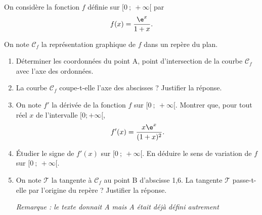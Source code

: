 \medskip

On considère la fonction $f$ définie sur $[0~;~+\infty[$ par \[f(x) =\dfrac{\e^x}{1+x}.\]

On note $\mathcal{C}_f$ la représentation graphique de $f$ dans un repère du plan.

\medskip

\begin{enumerate}
\item Déterminer les coordonnées du point A, point d'intersection de la courbe $\mathcal{C}_f$
avec l'axe des ordonnées.
\item La courbe $\mathcal{C}_f$ coupe-t-elle l'axe des abscisses ? Justifier la réponse.
\item On note $f'$ la dérivée de la fonction $f$ sur $[0~;~+\infty[$. Montrer que, pour tout
réel $x$ de l'intervalle $[0; +\infty[$, \[f'(x) =\dfrac{x\e^x}{(1 + x)^2}.\]
\item Étudier le signe de $f'(x)$ sur $[0~;~+\infty[$. En déduire le sens de variation de $f$ sur
$[0~;~+\infty[$.

\item On note $\mathcal{T}$ la tangente à $\mathcal{C}_f$ au point B d'abscisse 1,6. La tangente $\mathcal{T}$ passe-t-elle par l'origine du repère ? Justifier la réponse.

\emph{Remarque : \footnotesize {le texte donnait A mais A était déjà défini autrement}}
\end{enumerate}

\vspace{0,5cm}

